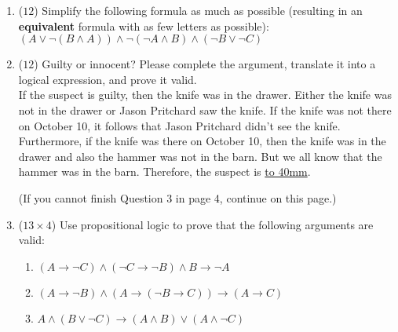 \documentclass[12pt]{article}
\begin{document}
\begin{enumerate}
\item ($12$)
Simplify the following formula as much as possible (resulting in an \textbf{equivalent} formula with as few letters as possible): $(A \lor \lnot (B \land A)) \land \lnot(\lnot A \land B) \land (\lnot B \lor \lnot C)$


\clearpage

\item ($12$)
Guilty or innocent? Please complete the argument, translate it into a logical expression, and prove it valid. \\

If the suspect is guilty, then the knife was in the drawer. Either the knife was not in the drawer or Jason Pritchard saw the knife. If the knife was not there on October 10, it follows that Jason Pritchard didn’t see the knife. Furthermore, if the knife was there on October 10, then the knife was in the drawer and also the hammer was not in the barn. But we all know that the hammer was in the barn. Therefore, the suspect is  \underline{\hbox to 40mm{}}.


\clearpage
(If you cannot finish Question 3 in page 4, continue on this page.)
\clearpage

\item ($13 \times 4$)
Use propositional logic to prove that the following arguments are valid:

\begin{enumerate}

\item
$(A \to \lnot C) \land (\lnot C \to \lnot B) \land B \to \lnot A$


\clearpage
\item
$(A \to \lnot B) \land (A \to (\lnot B \to C)) \to (A \to C)$


\clearpage
\item
$A \land (B \lor \lnot C) \to (A \land B) \lor (A \land \lnot C)$



\end{enumerate}
\end{enumerate}
\end{document}
